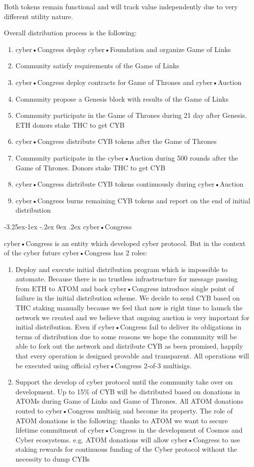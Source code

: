 \documentclass[8pt,oneside]{amsart}
\makeatletter
\renewcommand\subsection{\@startsection{subsection}{2}{\z@}%
                                     {-3.25ex\@plus -1ex \@minus -.2ex}%
                                     {0ex \@plus .2ex}%
                                     {\play\Large}}%
\newcommand{\titleSection}[1]{\subsection{#1}}
\makeatother
\begin{document}
Both tokens remain functional and will track value independently due to very different utility nature.

Overall distribution process is the following:

\begin{enumerate}
 \item cyber•Congress deploy cyber•Foundation and organize Game of Links
 \item Community satisfy requirements of the Game of Links
 \item cyber•Congress deploy contracts for Game of Thrones and cyber•Auction
 \item Community propose a Genesis block with results of the Game of Links
 \item Community participate in the Game of Thrones during 21 day after Genesis. ETH donors stake THC to get CYB
 \item cyber•Congress distribute CYB tokens after the Game of Thrones
 \item Community participate in the cyber•Auction during 500 rounds after the Game of Thrones. Donors stake THC to get CYB
 \item cyber•Congress distribute CYB tokens continuously during cyber•Auction
 \item cyber•Congress burns remaining CYB tokens and report on the end of initial distribution
\end{enumerate}

\titleSection{cyber•Congress}\label{cybercongress}

cyber•Congress is an entity which developed cyber protocol. But in the context of the cyber future cyber•Congress has 2 roles:
\begin{enumerate}
 \item Deploy and execute initial distribution program which is impossible to automate. Because there is no trustless infrastructure for message passing from ETH to ATOM and back cyber•Congress introduce single point of failure in the initial distribution scheme. We decide to send CYB based on THC staking manually because we feel that now is right time to launch the network we created and we believe that ongoing auction is very important for initial distribution. Even if cyber•Congress fail to deliver its obligations in terms of distribution due to some reasons we hope the community will be able to fork out the network and distribute CYB as been promised, happily that every operation is designed provable and transparent. All operations will be executed using official cyber•Congress 2-of-3 multisigs.
 \item Support the develop of cyber protocol until the community take over on development. Up to 15\% of CYB will be distributed based on donations in ATOMs during Game of Links and Game of Thrones. All ATOM donations routed to cyber•Congress multisig and become its property. The role of ATOM donations is the following: thanks to ATOM we want to secure lifetime commitment of cyber•Congress in the development of Cosmos and Cyber ecosystems. e.g. ATOM donations will allow cyber•Congress to use staking rewards for continuous funding of the Cyber protocol without the necessity to dump CYBs
\end{enumerate}
\end{document}
